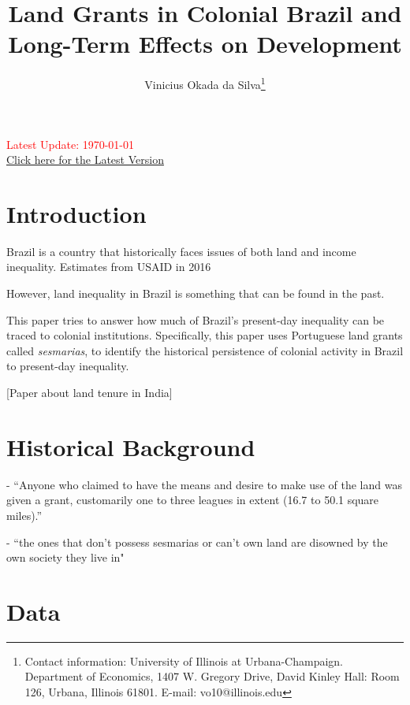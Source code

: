\documentclass{article}
\title{Land Grants in Colonial Brazil and Long-Term Effects on Development}
\author{Vinicius Okada da Silva\thanks{Contact information: University of Illinois at Urbana-Champaign. Department of Economics, 1407 W. Gregory Drive, David Kinley Hall: Room 126, Urbana, Illinois 61801. E-mail: vo10@illinois.edu}}
\affil{Department of Economics, University of Illinois at Urbana-Champaign}
\date{}
\begin{document}
\maketitle
\thispagestyle{empty} 

\vspace{-.1cm}
\begin{center}
  \textcolor{red}{Latest Update: \today}
  \\
  \href{https://viniokadasilva.github.io/Papers/JesuitsAmazon/JesuitsAmazon.pdf}{Click here for the Latest Version}
\end{center}
\vspace{.1cm}

\clearpage
{} 

\section{Introduction}

Brazil is a country that historically faces issues of both land and income inequality. Estimates from USAID in 2016

However, land inequality in Brazil is something that can be found in the past.

This paper tries to answer how much of Brazil's present-day inequality can be traced to colonial institutions. Specifically, this paper uses Portuguese land grants called \textit{sesmarias}, to identify the historical persistence of colonial activity in Brazil to present-day inequality.

\parencite{Dell2010-qt}
\parencite{Sokoloff2000-mb}



\textcite{Ratnoo2023-vw} [Paper about land tenure in India]


\section{Historical Background}

\textcite{Dean1971-iq} - ``Anyone who claimed to have the means and desire to make use of the land was given a grant, customarily one to three leagues in extent (16.7 to 50.1 square miles).''

\textcite{Simonsen2005-ps} - ``the ones that don't possess sesmarias or can't own land are disowned by the own society they live in"

\section{Data}
\end{document}

